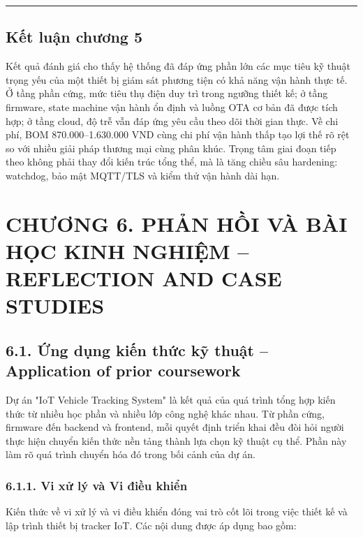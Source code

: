 \documentclass[13pt,a4paper]{extarticle}
\renewcommand{\\}{\thesislongtableorignewline\hline}%
\newcommand{\chapterheading}[1]{\clearpage\section*{#1}\setcounter{subsection}{0}}
\begin{document}
\begin{center}\rule{0.5\linewidth}{0.5pt}\end{center}

\subsection{Kết luận chương
5}\label{kux1ebft-luux1eadn-chux1b0ux1a1ng-5}

Kết quả đánh giá cho thấy hệ thống đã đáp ứng phần lớn các mục tiêu kỹ
thuật trọng yếu của một thiết bị giám sát phương tiện có khả năng vận
hành thực tế. Ở tầng phần cứng, mức tiêu thụ điện duy trì trong ngưỡng
thiết kế; ở tầng firmware, state machine vận hành ổn định và luồng OTA cơ
bản đã được tích hợp; ở tầng cloud, độ trễ vẫn đáp ứng yêu cầu theo dõi
thời gian thực. Về chi phí, BOM 870.000--1.630.000 VND cùng chi phí vận
hành thấp tạo lợi thế rõ rệt so với nhiều giải pháp thương mại cùng phân
khúc. Trọng tâm giai đoạn tiếp theo không phải thay đổi kiến trúc tổng
thể, mà là tăng chiều sâu hardening: watchdog, bảo mật MQTT/TLS và kiểm
thử vận hành dài hạn.

\chapterheading{CHƯƠNG 6. PHẢN HỒI VÀ BÀI HỌC KINH NGHIỆM -- REFLECTION AND CASE STUDIES}

\subsection{6.1. Ứng dụng kiến thức kỹ thuật -- Application of prior
coursework}\label{61-ux1ee9ng-dux1ee5ng-kiux1ebfn-thux1ee9c-kux1ef9-thuux1eadt--application-of-prior-coursework}

Dự án "IoT Vehicle Tracking System" là kết quả của quá trình tổng hợp
kiến thức từ nhiều học phần và nhiều lớp công nghệ khác nhau. Từ phần
cứng, firmware đến backend và frontend, mỗi quyết định triển khai đều
đòi hỏi người thực hiện chuyển kiến thức nền tảng thành lựa chọn kỹ
thuật cụ thể. Phần này làm rõ quá trình chuyển hóa đó trong bối cảnh của
dự án.

\subsubsection{6.1.1. Vi xử lý và Vi điều
khiển}\label{611-vi-xux1eed-luxfd-vuxe0-vi-ux111iux1ec1u-khiux1ec3n}

Kiến thức về vi xử lý và vi điều khiển đóng vai trò cốt lõi trong việc
thiết kế và lập trình thiết bị tracker IoT. Các nội dung được áp dụng
bao gồm:
\end{document}
